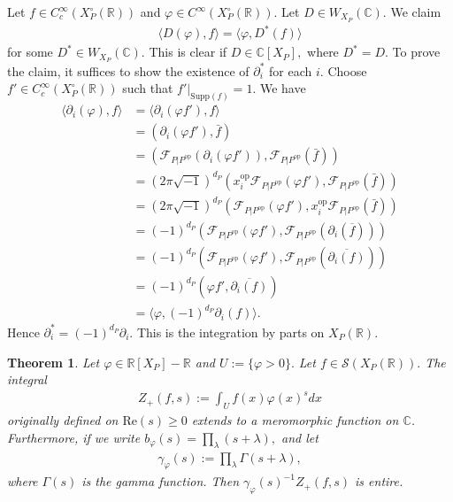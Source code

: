 \documentclass[11pt,a4paper,usenames,dvipsnames,reqno]{amsart}
\numberwithin{equation}{section}
\newcommand{\cc}{\mathbb C}
\newcommand{\rr}{\mathbb R}
\newtheorem{Thm}{Theorem}[section]
\theoremstyle{definition}
\theoremstyle{remark}
\begin{document}
 
 Let $f\in C^\infty_c(X_P^\circ(\rr))$ and $\varphi\in C^\infty(X_P^\circ(\rr)).$ Let $D\in W_{X_P}(\cc)$. We claim
\begin{align*}
     \langle D(\varphi), f\rangle=\langle \varphi, D^{\ast}(f) \rangle   
\end{align*}
for some $D^\ast\in W_{X_P}(\cc)$. This is clear if $D\in \cc[X_P],$ where $D^\ast =D$. To prove the claim, it suffices to show the existence of $\partial_i^*$ for each $i$. Choose $f'\in C^\infty_c(X_P^\circ(\rr))$ such that $f'|_{\mathrm{Supp}(f)}=1$. We have
\begin{align*}
     \langle \partial_i(\varphi), f\rangle&= \langle \partial_i(\varphi f'), f\rangle\\
     &=( \partial_i(\varphi f'), \bar{f})\\
     &=(  \mathcal{F}_{P|P^{\mathrm{op}}}(\partial_i(\varphi f')),  \mathcal{F}_{P|P^{\mathrm{op}}}(\bar{f}))\\
     &=(2\pi\sqrt{-1})^{d_P}( x_i^{\mathrm{op}}\mathcal{F}_{P|P^{\mathrm{op}}} (\varphi f'), \mathcal{F}_{P|P^{\mathrm{op}}}(\bar{f}))\\
     &=(2\pi\sqrt{-1})^{d_P}( \mathcal{F}_{P|P^{\mathrm{op}}} (\varphi f'), x_i^{\mathrm{op}}\mathcal{F}_{P|P^{\mathrm{op}}}(\bar{f}))\\
          &=(-1)^{d_P}( \mathcal{F}_{P|P^{\mathrm{op}}} (\varphi f'), \mathcal{F}_{P|P^{\mathrm{op}}}(\partial_i(\overline{ f})))\\
          &=(-1)^{d_P}( \mathcal{F}_{P|P^{\mathrm{op}}} (\varphi f'), \mathcal{F}_{P|P^{\mathrm{op}}}(\overline{\partial_i(f)}))\\
          &=(-1)^{d_P}( \varphi f', \overline{\partial_i(f)})\\
     &=\langle \varphi, (-1)^{d_P}\partial_i (f)\rangle.
\end{align*}
Hence $\partial_i^\ast=(-1)^{d_P}\partial_i.$ This is the integration by parts on $X_P(\rr)$.

\begin{Thm}\label{thm:Z+ext}
    Let $\varphi\in \rr[X_P]-\rr$ and $U:=\{\varphi>0\}.$ Let $f\in \mathcal{S}(X_P(\rr)).$ The integral 
    \begin{align*}
       Z_+(f,s):=\int_{U} f(x)\varphi(x)^s dx
    \end{align*}
    originally defined on $\mathrm{Re}(s)\ge 0$ extends to a meromorphic function on $\cc$. Furthermore, if we write $ b_\varphi(s)=\prod_{\lambda} (s+\lambda),$ and let
    \begin{align*}
       \gamma_\varphi(s):={\prod_{\lambda}\Gamma(s+\lambda)},
    \end{align*}
    where $\Gamma(s)$ is the gamma function. Then $\gamma_\varphi(s)^{-1}Z_+(f,s)$ is entire. 
\end{Thm}
\end{document}
